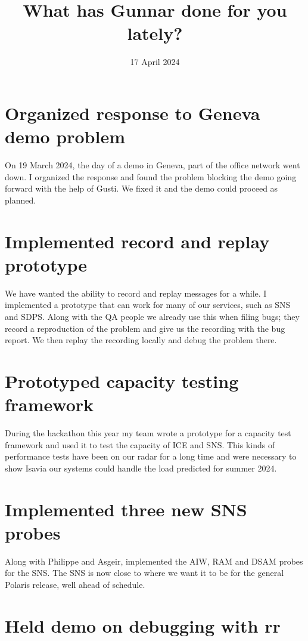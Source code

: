 \documentclass[11pt]{article}
\date{17 April 2024}
\title{What has Gunnar done for you lately?}
\begin{document}
\maketitle

\section{Organized response to Geneva demo problem}
\label{sec:org43fdb1a}

On 19 March 2024, the day of a demo in Geneva, part of the office network went down. I organized the response and found the problem blocking the demo going forward with the help of Gusti. We fixed it and the demo could proceed as planned.

\section{Implemented record and replay prototype}
\label{sec:org2c6f0c0}

We have wanted the ability to record and replay messages for a while. I implemented a prototype that can work for many of our services, such as SNS and SDPS. Along with the QA people we already use this when filing bugs; they record a reproduction of the problem and give us the recording with the bug report. We then replay the recording locally and debug the problem there.

\section{Prototyped capacity testing framework}
\label{sec:org83359a9}

During the hackathon this year my team wrote a prototype for a capacity test framework and used it to test the capacity of ICE and SNS. This kinds of performance tests have been on our radar for a long time and were necessary to show Isavia our systems could handle the load predicted for summer 2024.

\section{Implemented three new SNS probes}
\label{sec:orga21924b}

Along with Philippe and Asgeir, implemented the AIW, RAM and DSAM probes for the SNS. The SNS is now close to where we want it to be for the general Polaris release, well ahead of schedule.

\section{Held demo on debugging with rr}
\label{sec:orgece36ab}
\end{document}
